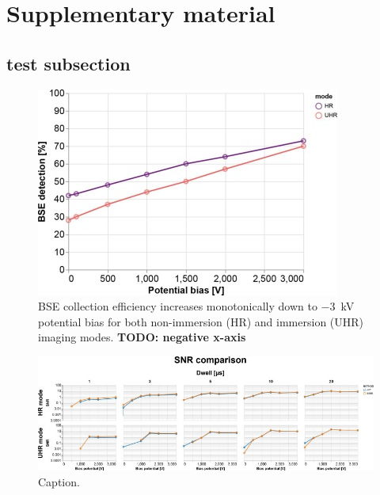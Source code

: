 \clearpage

\renewcommand\thesection{\arabic{chapter}.\Alph{section}}
\setcounter{section}{0}
\section{Supplementary material}
\label{sec:2_supplement}

\renewcommand{\thefigure}{S\arabic{figure}}
\setcounter{figure}{0}

\subsection{test subsection}

\begin{figure}[!tbh]
    \centering
    \includegraphics[width=0.6\linewidth]{chapter-2/figures_JPEG_LQ/fig2-S1_percentages.jpg}
    \caption{BSE collection efficiency increases monotonically down to \SI{-3}{\kilo\volt} potential bias for both non-immersion (HR) and immersion (UHR) imaging modes.
    \textbf{TODO: negative x-axis}}
    \label{fig:2.S1_percentages}
\end{figure}



\begin{figure}[!tbh]
    \centering
    \includegraphics[width=\linewidth]{chapter-2/figures_JPEG_LQ/fig2-S2_comparison.jpg}
    \caption{Caption.}
    \label{fig:2.S2_comparison}
\end{figure}
